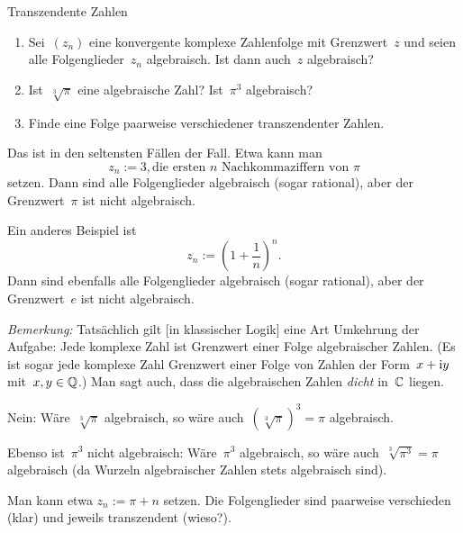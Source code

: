 \documentclass{algblatt}
\begin{document}
\begin{aufgabe}{Transzendente Zahlen}
\begin{enumerate}
\item Sei~$(z_n)$ eine konvergente komplexe Zahlenfolge mit Grenzwert~$z$ und
seien alle Folgenglieder~$z_n$ algebraisch. Ist dann auch~$z$ algebraisch?
\item Ist~$\sqrt[3]{\pi}$ eine algebraische Zahl? Ist~$\pi^3$ algebraisch?
\item Finde eine Folge paarweise verschiedener transzendenter Zahlen.
\end{enumerate}

\begin{loesungE}
\item Das ist in den seltensten Fällen der Fall. Etwa kann man
\[ z_n := 3{,}\text{die ersten~$n$ Nachkommaziffern von~$\pi$} \]
setzen. Dann sind alle Folgenglieder algebraisch (sogar rational), aber der
Grenzwert~$\pi$ ist nicht algebraisch.

Ein anderes Beispiel ist
\[ z_n := \left(1 + \frac{1}{n}\right)^n. \]
Dann sind ebenfalls alle Folgenglieder algebraisch (sogar rational), aber der
Grenzwert~$e$ ist nicht algebraisch.

\emph{Bemerkung:} Tatsächlich gilt [in klassischer Logik] eine Art Umkehrung
der Aufgabe: Jede komplexe Zahl ist Grenzwert einer Folge algebraischer Zahlen.
(Es ist sogar jede komplexe Zahl Grenzwert einer Folge von Zahlen der
Form~$x+\mathrm{i} y$ mit~$x,y \in \mathbb{Q}$.) Man sagt auch, dass die algebraischen Zahlen
\emph{dicht} in~$\mathbb{C}$ liegen.

\item Nein: Wäre~$\sqrt[3]{\pi}$ algebraisch, so wäre auch~$(\sqrt[3]{\pi})^3 =
\pi$ algebraisch.

Ebenso ist~$\pi^3$ nicht algebraisch: Wäre~$\pi^3$ algebraisch, so wäre
auch~$\sqrt[3]{\pi^3} = \pi$ algebraisch (da Wurzeln algebraischer Zahlen stets
algebraisch sind).

\item Man kann etwa $z_n := \pi + n$ setzen. Die Folgenglieder sind paarweise
verschieden (klar) und jeweils transzendent (wieso?).
\end{loesungE}
\end{aufgabe}
\end{document}
